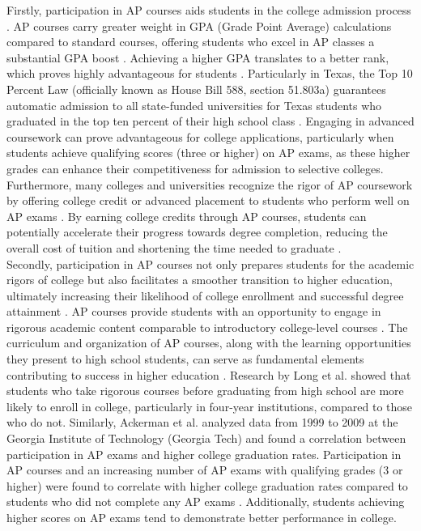 \documentclass[sn-mathphys-num]{sn-jnl}%
\theoremstyle{thmstyleone}%
\theoremstyle{thmstyletwo}%
\theoremstyle{thmstylethree}%
\begin{document}
Firstly, participation in AP courses aids students in the college admission process \cite{curtis2002learning, diyanni2002origins}. AP courses carry greater weight in GPA (Grade Point Average) calculations compared to standard courses, offering students who excel in AP classes a substantial GPA boost \cite{collegeoutcomescomparison}. Achieving a higher GPA translates to a better rank, which proves highly advantageous for students \cite{curtis2002learning}. Particularly in Texas, the Top 10 Percent Law (officially known as House Bill 588, section 51.803a) guarantees automatic admission to all state-funded universities for Texas students who graduated in the top ten percent of their high school class \cite{texas_legislation}. Engaging in advanced coursework can prove advantageous for college applications, particularly when students achieve qualifying scores (three or higher) on AP exams, as these higher grades can enhance their competitiveness for admission to selective colleges\cite{geiser2004role}. Furthermore, many colleges and universities recognize the rigor of AP coursework by offering college credit or advanced placement to students who perform well on AP exams \cite{diyanni2002origins}. By earning college credits through AP courses, students can potentially accelerate their progress towards degree completion, reducing the overall cost of tuition and shortening the time needed to graduate \cite{curtis2002learning, collegeoutcomescomparison}.\\

Secondly, participation in AP courses not only prepares students for the academic rigors of college but also facilitates a smoother transition to higher education, ultimately increasing their likelihood of college enrollment and successful degree attainment \cite{long2012effects, ackerman2013high, gurantz2021college, geiser2004role}. AP courses provide students with an opportunity to engage in rigorous academic content comparable to introductory college-level courses \cite{apreport, curtis2002learning}. The curriculum and organization of AP courses, along with the learning opportunities they present to high school students, can serve as fundamental elements contributing to success in higher education \cite{curtis2002learning}. Research by Long et al. \cite{long2012effects} showed that students who take rigorous courses before graduating from high school are more likely to enroll in college, particularly in four-year institutions, compared to those who do not. Similarly, Ackerman et al.  \cite{ackerman2013high} analyzed data from 1999 to 2009 at the Georgia Institute of Technology (Georgia Tech) and found a correlation between participation in AP exams and higher college graduation rates. Participation in AP courses and an increasing number of AP exams with qualifying grades (3 or higher) were found to correlate with higher college graduation rates compared to students who did not complete any AP exams \cite{ackerman2013high}. Additionally, students achieving higher scores on AP exams tend to demonstrate better performance in college\cite{geiser2004role, ackerman2013high}.\\
\end{document}
